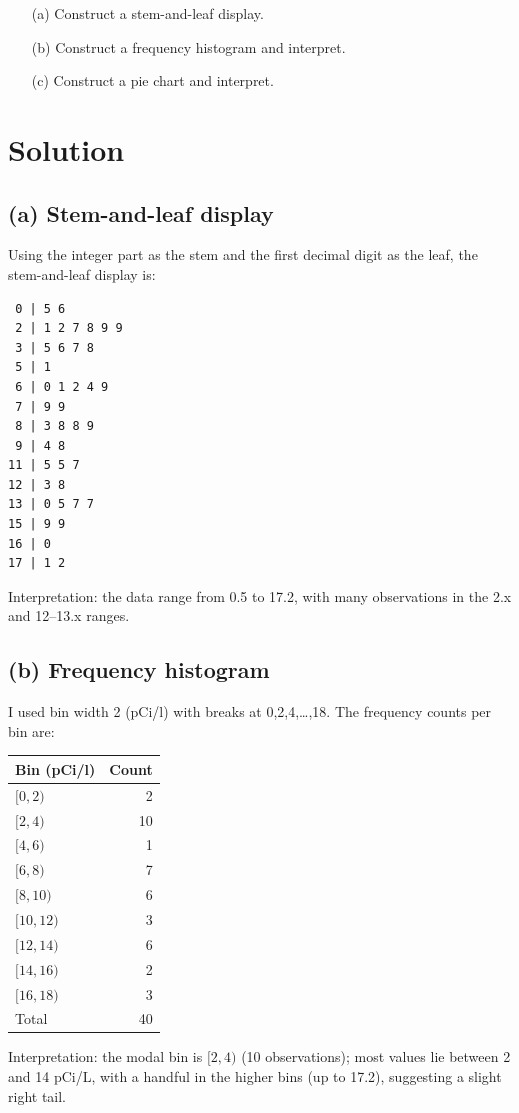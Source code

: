 \documentclass[12pt]{article}
\begin{document}
\begin{enumerate}
    \item[(a)] Construct a stem-and-leaf display.
    \item[(b)] Construct a frequency histogram and interpret.
    \item[(c)] Construct a pie chart and interpret.
\end{enumerate}

\section*{Solution}
\subsection*{(a) Stem-and-leaf display}
Using the integer part as the stem and the first decimal digit as the leaf, the stem-and-leaf display is:

\begin{verbatim}
 0 | 5 6
 2 | 1 2 7 8 9 9
 3 | 5 6 7 8
 5 | 1
 6 | 0 1 2 4 9
 7 | 9 9
 8 | 3 8 8 9
 9 | 4 8
11 | 5 5 7
12 | 3 8
13 | 0 5 7 7
15 | 9 9
16 | 0
17 | 1 2
\end{verbatim}

Interpretation: the data range from 0.5 to 17.2, with many observations in the 2.x and 12–13.x ranges.

\subsection*{(b) Frequency histogram}
I used bin width 2 (pCi/l) with breaks at 0,2,4,\dots,18. The frequency counts per bin are:

\begin{tabular}{lr}
\toprule
Bin (pCi/l) & Count \\
\midrule
$[0,2)$   & 2 \\
$[2,4)$   & 10 \\
$[4,6)$   & 1 \\
$[6,8)$   & 7 \\
$[8,10)$  & 6 \\
$[10,12)$ & 3 \\
$[12,14)$ & 6 \\
$[14,16)$ & 2 \\
$[16,18)$ & 3 \\
\midrule
Total & 40 \\
\bottomrule
\end{tabular}

\noindent Interpretation: the modal bin is $[2,4)$ (10 observations); most values lie between 2 and 14 pCi/L, with a handful in the higher bins (up to 17.2), suggesting a slight right tail.
\end{document}
